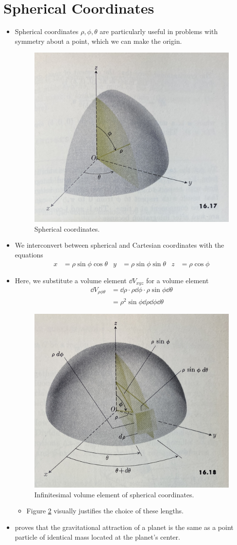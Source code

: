 \documentclass[../main.tex]{subfiles}
\begin{document}
\section{Spherical Coordinates}
\begin{itemize}
    \item Spherical coordinates $\rho,\phi,\theta$ are particularly useful in problems with symmetry about a point, which we can make the origin.
    \begin{figure}[h!]
        \centering
        \includegraphics[width=0.4\linewidth]{ExtFiles/sphericalCoordinates.jpg}
        \caption{Spherical coordinates.}
        \label{fig:sphericalCoordinates}
    \end{figure}
    \item We interconvert between spherical and Cartesian coordinates with the equations
    \begin{align*}
        x &= \rho\sin\phi\cos\theta&
            y &= \rho\sin\phi\sin\theta&
                z &= \rho\cos\phi
    \end{align*}
    \item Here, we substitute a volume element $\dd{V}_{xyz}$ for a volume element
    \begin{align*}
        \dd{V}_{\rho\phi\theta} &= \dd{\rho}\cdot\rho\dd{\phi}\cdot\rho\sin\phi\dd{\theta}\\
        &= \rho^2\sin\phi\dd{\rho}\dd{\phi}\dd{\theta}
    \end{align*}
    \begin{figure}[h!]
        \centering
        \includegraphics[width=0.4\linewidth]{ExtFiles/dVspherical.jpg}
        \caption{Infinitesimal volume element of spherical coordinates.}
        \label{fig:dVspherical}
    \end{figure}
    \begin{itemize}
        \item Figure \ref{fig:dVspherical} visually justifies the choice of these lengths.
    \end{itemize}
    \item \textcite{bib:Thomas} proves that the gravitational attraction of a planet is the same as a point particle of identical mass located at the planet's center.
\end{itemize}
\end{document}
